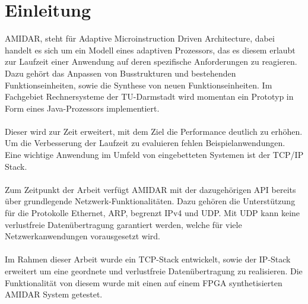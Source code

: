 \chapter{Einleitung}

AMIDAR, steht für Adaptive Microinstruction Driven Architecture, dabei handelt es sich um ein Modell eines adaptiven Prozessors, das es diesem erlaubt zur Laufzeit einer Anwendung auf deren spezifische Anforderungen zu reagieren. Dazu gehört das Anpassen von Busstrukturen und bestehenden Funktionseinheiten, sowie die Synthese von neuen Funktionseinheiten.
Im Fachgebiet Rechnersysteme der TU-Darmstadt wird momentan ein Prototyp in Form eines Java-Prozessors implementiert. \\\\
Dieser wird zur Zeit erweitert, mit dem Ziel die Performance deutlich zu erhöhen. Um die Verbesserung der Laufzeit zu evaluieren fehlen Beispielanwendungen. Eine wichtige Anwendung im Umfeld von eingebetteten Systemen ist der TCP/IP Stack.\\\\
Zum Zeitpunkt der Arbeit verfügt AMIDAR mit der dazugehörigen API bereits über grundlegende Netzwerk-Funktionalitäten. Dazu gehören die Unterstützung für die Protokolle Ethernet, ARP, begrenzt IPv4 und UDP. Mit UDP kann keine verlustfreie Datenübertragung garantiert werden, welche für viele Netzwerkanwendungen vorausgesetzt wird.\\\\
Im Rahmen dieser Arbeit wurde ein TCP-Stack entwickelt, sowie der IP-Stack erweitert um eine geordnete und verlustfreie Datenübertragung zu realisieren. Die Funktionalität von diesem wurde mit einen auf einem FPGA synthetisierten AMIDAR System getestet.
